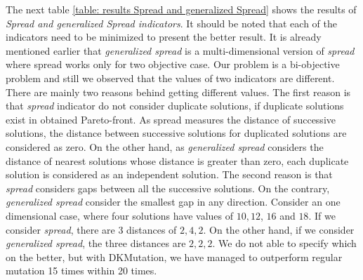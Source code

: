 \documentclass{article}
\begin{document}
The next table \ref{table: results Spread and generalized Spread} shows the results of \textit{Spread and generalized Spread indicators}. 
It should be noted that each of the indicators need to be minimized to present the better result. 
It is already mentioned earlier that \textit{generalized spread} is a multi-dimensional version of \textit{spread} where spread works only for two objective case. 
Our problem is a bi-objective problem and still we observed that the values of two indicators are different.  
There are mainly two reasons behind getting different values. 
The first reason is that \textit{spread} indicator do not consider duplicate solutions, if duplicate solutions exist in obtained Pareto-front. 
As spread measures the distance of successive solutions, the distance between successive solutions for duplicated solutions are considered as zero. 
On the other hand, as \textit{generalized spread} considers the distance of nearest solutions whose distance is greater than zero, each duplicate solution is considered as an independent solution. 
The second reason is that \textit{spread} considers  gaps between all the successive solutions. 
On the contrary, \textit{generalized spread} consider the smallest gap in any direction. 
Consider an one dimensional case, where four solutions have values of $10, 12$, $16$ and $18$. 
If we consider \textit{spread}, there are 3 distances of $2, 4, 2$. 
On the other hand, if we consider \textit{generalized spread}, the three distances are $2, 2, 2$. 
We do not able to specify which on the better, but with DKMutation, we have managed to outperform regular mutation 15 times within 20 times.
\end{document}
